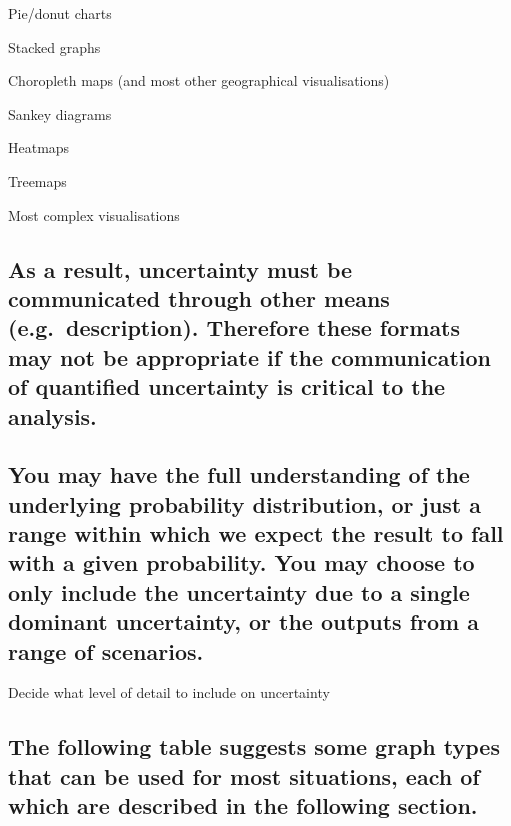 \documentclass[]{book}
\begin{document}
Pie/donut charts

Stacked graphs

Choropleth maps (and most other geographical visualisations)

Sankey diagrams

Heatmaps

Treemaps

Most complex visualisations

\subsection*{As a result, uncertainty must be communicated through other
means (e.g.~description). Therefore these formats may not be appropriate
if the communication of quantified uncertainty is critical to the
analysis.}\label{as-a-result-uncertainty-must-be-communicated-through-other-means-e.g.description.-therefore-these-formats-may-not-be-appropriate-if-the-communication-of-quantified-uncertainty-is-critical-to-the-analysis.}

\subsection{You may have the full understanding of the underlying
probability distribution, or just a range within which we expect the
result to fall with a given probability. You may choose to only include
the uncertainty due to a single dominant uncertainty, or the outputs
from a range of
scenarios.}\label{you-may-have-the-full-understanding-of-the-underlying-probability-distribution-or-just-a-range-within-which-we-expect-the-result-to-fall-with-a-given-probability.-you-may-choose-to-only-include-the-uncertainty-due-to-a-single-dominant-uncertainty-or-the-outputs-from-a-range-of-scenarios.}

 Decide what level of detail to include on uncertainty

\subsection{The following table suggests some graph types that can be
used for most situations, each of which are described in the following
section.}\label{the-following-table-suggests-some-graph-types-that-can-be-used-for-most-situations-each-of-which-are-described-in-the-following-section.}
\end{document}
